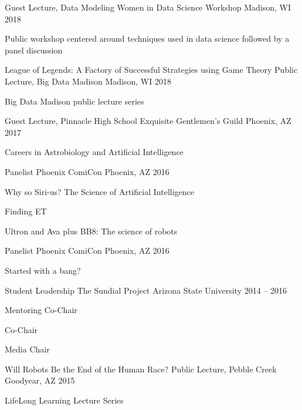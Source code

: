 \begin{cventries}
\cventry
    {Guest Lecture, Data Modeling}
    {Women in Data Science Workshop}
    {Madison, WI}
    {2018}
    {\begin{cvitems}
        \item {Public workshop centered around techniques used in data science followed by a panel discussion}
      \end{cvitems}}

\cventry
    {League of Legends: A Factory of Successful Strategies using Game Theory}
    {Public Lecture, Big Data Madison}
    {Madison, WI}
    {2018}
    {\begin{cvitems}
        \item {Big Data Madison public lecture series}
      \end{cvitems}}

\cventry
    {Guest Lecture, Pinnacle High School}
    {Exquisite Gentlemen’s Guild}
    {Phoenix, AZ}
    {2017}
    {\begin{cvitems}
        \item {Careers in Astrobiology and Artificial Intelligence}
      \end{cvitems}}

\cventry
    {Panelist}
    {Phoenix ComiCon}
    {Phoenix, AZ}
    {2016}
    {\begin{cvitems}
        \item {Why so Siri-us? The Science of Artificial Intelligence}
        \item {Finding ET}
        \item {Ultron and Ava plus BB8: The science of robots}
      \end{cvitems}}

\cventry
    {Panelist}
    {Phoenix ComiCon}
    {Phoenix, AZ}
    {2016}
    {\begin{cvitems}
        \item {Started with a bang?}
      \end{cvitems}}

\cventry
    {Student Leadership}
    {The Sundial Project}
    {Arizona State University}
    {2014 -- 2016}
    {\begin{cvitems}
        \item {Mentoring Co-Chair}
        \item {Co-Chair}
        \item {Media Chair}
      \end{cvitems}}

\cventry
    {Will Robots Be the End of the Human Race?}
    {Public Lecture, Pebble Creek}
    {Goodyear, AZ}
    {2015}
    {\begin{cvitems}
        \item {LifeLong Learning Lecture Series}
      \end{cvitems}}


\end{cventries}
